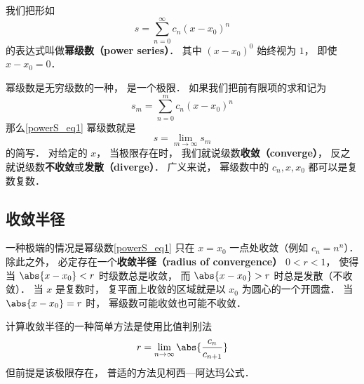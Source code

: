 
\begin{issues}
\issueDraft
{}
\end{issues}


我们把形如
\begin{equation}\label{powerS_eq1}
s = \sum_{n=0}^\infty c_n (x-x_0)^n
\end{equation}
的表达式叫做\textbf{幂级数（power series）}． 其中 $(x-x_0)^0$ 始终视为 $1$， 即使 $x-x_0 = 0$．

幂级数是无穷级数的一种， 是一个极限． 如果我们把前有限项的求和记为
\begin{equation}
s_m = \sum_{n=0}^m c_n (x-x_0)^n
\end{equation}
那么\autoref{powerS_eq1} 幂级数就是
\begin{equation}
s = \lim_{m\to\infty} s_m
\end{equation}
的简写． 对给定的 $x$， 当极限存在时， 我们就说级数\textbf{收敛（converge）}， 反之就说级数\textbf{不收敛}或\textbf{发散（diverge）}． 广义来说， 幂级数中的 $c_n, x, x_0$ 都可以是复数复数．

\subsection{收敛半径}
一种极端的情况是幂级数\autoref{powerS_eq1} 只在 $x = x_0$ 一点处收敛（例如 $c_n = n^n$）． 除此之外， 必定存在一个\textbf{收敛半径（radius of convergence）} $0 < r < 1$， 使得当 $\abs{x-x_0} < r$ 时级数总是收敛， 而 $\abs{x-x_0} > r$ 时总是发散（不收敛）． 当 $x$ 是复数时， 复平面上收敛的区域就是以 $x_0$ 为圆心的一个开圆盘． 当 $\abs{x - x_0} = r$ 时， 幂级数可能收敛也可能不收敛．

计算收敛半径的一种简单方法是使用比值判别法
\begin{equation}
r = \lim_{n \to \infty} \abs{\frac{c_n}{c_{n+1}}}
\end{equation}
但前提是该极限存在， 普适的方法见柯西—阿达玛公式．
